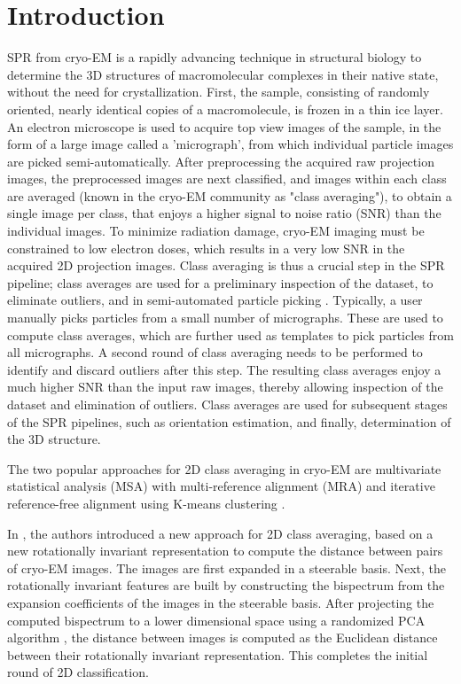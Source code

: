 \documentclass{article}
\begin{document}
\section{Introduction}
\label{sec:intro}
SPR from cryo-EM is a rapidly advancing technique in structural biology to determine
the 3D structures of macromolecular complexes in their native state,
 without the need for crystallization. First, the sample, consisting of randomly oriented, nearly identical copies of a macromolecule, is frozen in a thin ice layer. An electron microscope is used to acquire top view images of the sample, in the form of a large image called a 'micrograph', from which individual particle images are picked semi-automatically. After preprocessing the acquired raw projection images, the preprocessed images are next classified, and images within each class are averaged (known in the cryo-EM community as "class averaging"), to obtain a single image per class, that enjoys a higher signal to noise ratio (SNR) than the individual images. To minimize radiation damage, cryo-EM imaging must be constrained to low electron doses, which results in a very low SNR in the acquired 2D projection images. Class averaging is thus a crucial step in the SPR pipeline; class averages are used for a preliminary inspection of the dataset, to eliminate outliers, and in semi-automated particle picking \cite{relion}. Typically, a user manually picks particles from a small number of micrographs. These are used to compute class averages, which are further used as templates to pick particles from all micrographs. A second round of class averaging needs to be performed to identify and discard outliers after this step. The resulting class averages enjoy a much higher SNR than the input raw images, thereby allowing inspection of the dataset and elimination of outliers. Class averages are used for subsequent stages of the SPR pipelines, such as orientation estimation, and finally, determination of the 3D structure.
 
The two popular approaches for 2D class averaging \cite{Penczek1992,Penczek1996, vanHeel1990a, vanHeel1981} in cryo-EM are multivariate statistical analysis (MSA)\cite{vanHeel1981} with multi-reference alignment (MRA) \cite{Dube1993} and iterative reference-free alignment using K-means clustering \cite{Penczek1996}.

In \cite{zhao}, the authors introduced a new approach for 2D class averaging, based on a new rotationally invariant representation to compute the distance between pairs of cryo-EM images. The images are first expanded in a steerable basis. Next, the rotationally invariant features are built by constructing the bispectrum from the expansion coefficients of the images in the steerable basis. After projecting the computed bispectrum to a lower dimensional space using a randomized PCA algorithm \cite{rokhlin}, the distance between images is computed as the Euclidean distance between their rotationally invariant representation. This completes the initial round of 2D classification. 
\end{document}
